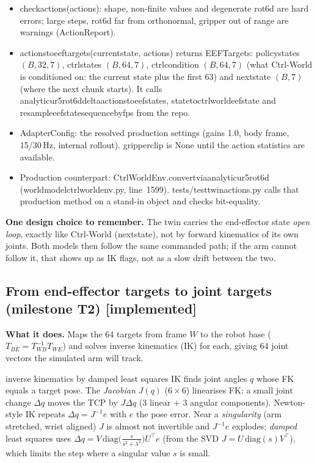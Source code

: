 \documentclass[11pt,a4paper]{article}
\newcommand{\done}{\textcolor{okgreen}{\textbf{[implemented]}}}
\newcommand{\code}[1]{{\small\ttfamily\begingroup\def\_{\textunderscore\allowbreak}\def\/{/\allowbreak}#1\endgroup}}
\begin{document}
\begin{incode}[: \code{src/twin/actions.py}]
\begin{itemize}[leftmargin=*]
\item \code{check\_actions(actions)}: shape, non-finite values and degenerate rot6d are hard errors; large steps, rot6d far from orthonormal, gripper out of range are warnings (\code{ActionReport}).
\item \code{actions\_to\_eef\_targets(current\_state, actions)} returns \code{EEFTargets}: \code{policy\_states} $(B,32,7)$, \code{ctrl\_states} $(B,64,7)$, \code{ctrl\_condition} $(B,64,7)$ (what Ctrl-World is conditioned on: the current state plus the first 63) and \code{next\_state} $(B,7)$ (where the next chunk starts). It calls \code{analytic\_ur5\_rot6d\_delta\_actions\_to\_eef\_states}, \code{state\_to\_ctrl\_world\_eef\_state} and \code{resample\_eef\_state\_sequence\_by\_fps} from the repo.
\item \code{AdapterConfig}: the resolved production settings (gains 1.0, body frame, 15/30\,Hz, internal rollout). \code{gripper\_clip} is \code{None} until the action statistics are available.
\item Production counterpart: \code{CtrlWorldEnv.\_convert\_via\_analytic\_ur5\_rot6d} (\code{world\_model\_ctrl\_world\_env.py}, line~1599). \code{tests/test\_twin\_actions.py} calls that production method on a stand-in object and checks bit-equality.
\end{itemize}
\end{incode}

\textbf{One design choice to remember.} The twin carries the end-effector state \emph{open loop}, exactly like Ctrl-World (\code{next\_state}), not by forward kinematics of its own joints. Both models then follow the same commanded path; if the arm cannot follow it, that shows up as IK flags, not as a slow drift between the two.

\subsection{From end-effector targets to joint targets (milestone T2) \done}\label{sec:ik}
\textbf{What it does.} Maps the 64 targets from frame $W$ to the robot base ($T_{BE}=T_{WB}^{-1}T_{WE}$) and solves inverse kinematics (IK) for each, giving 64 joint vectors the simulated arm will track.

\begin{newc}{inverse kinematics by damped least squares}
IK finds joint angles $q$ whose FK equals a target pose. The \emph{Jacobian} $J(q)$ ($6\times6$) linearises FK: a small joint change $\Delta q$ moves the TCP by $J\Delta q$ (3 linear + 3 angular components). Newton-style IK repeats $\Delta q=J^{-1}e$ with $e$ the pose error. Near a \emph{singularity} (arm stretched, wrist aligned) $J$ is almost not invertible and $J^{-1}e$ explodes; \emph{damped} least squares uses $\Delta q=V\,\mathrm{diag}\!\big(\tfrac{s}{s^2+\lambda^2}\big)U^\top e$ (from the SVD $J=U\,\mathrm{diag}(s)V^\top$), which limits the step where a singular value $s$ is small.
\end{newc}
\end{document}
